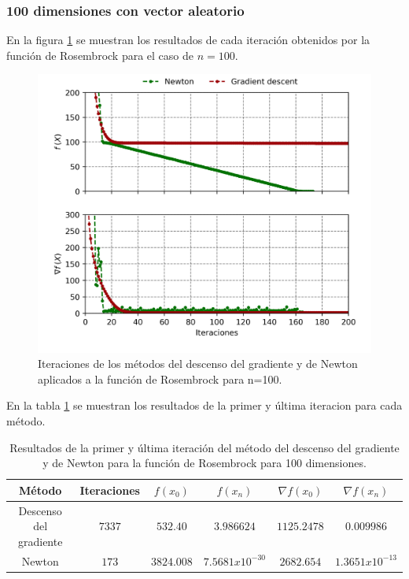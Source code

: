 \subsubsection{100 dimensiones con vector aleatorio}

En la figura \ref{fig:rosembrock_100_random} se muestran los resultados de cada iteración obtenidos por la función de Rosembrock para el caso de $n=100$.

\begin{figure}[H]
    \centering
    \includegraphics[width=12cm]{Graphics/Problema_2/rosembrock_100_random.png}
    \caption{Iteraciones de los métodos del descenso del gradiente y de Newton aplicados a la función de Rosembrock para n=100.}
    \label{fig:rosembrock_100_random}
\end{figure}

En la tabla \ref{table:rosembrock_100_random} se muestran los resultados de la primer y última iteracion para cada método.

\begin{table}[H]
    \centering
    \begin{tabular}{cccccc} \hline
        Método                 & Iteraciones & $f(x_0)$   & $f(x_n)$          & $\nabla f(x_0)$ & $\nabla f(x_n) $  \\ \hline
        Descenso del gradiente & $7337$      & $532.40 $  & $3.986624$        & $1125.2478$     & $0.009986$        \\
        Newton                 & $173$       & $3824.008$ & $7.5681x10^{-30}$ & $2682.654$      & $1.3651x10^{-13}$ \\ \hline
    \end{tabular}
    \caption{Resultados de la primer y última iteración del método del descenso del gradiente y de Newton para la función de Rosembrock para 100 dimensiones.}
    \label{table:rosembrock_100_random}
\end{table}

